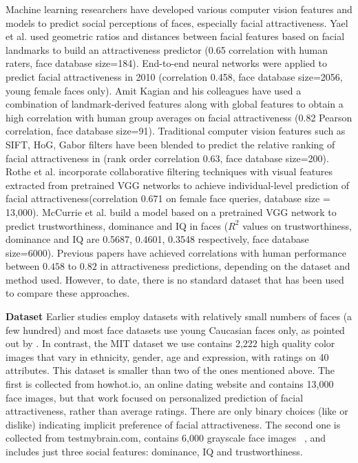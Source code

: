 \documentclass[10pt,twocolumn,letterpaper]{article}
\begin{document}
Machine learning researchers have developed various computer vision features and models to predict social perceptions of faces, especially facial attractiveness. Yael et al.\cite{eisenthal2006facial} used geometric ratios and distances between facial features based on facial landmarks to build an attractiveness predictor (0.65 correlation with human raters, face database size=184). End-to-end neural networks were applied to predict facial attractiveness in 2010\cite{gray2010predicting} (correlation 0.458, face database size=2056, young female faces only). Amit Kagian and his colleagues have used a combination of landmark-derived features along with global features to obtain a high correlation with human group averages on facial attractiveness \cite{kagian2008machine}(0.82 Pearson correlation, face database size=91). Traditional computer vision features such as SIFT, HoG, Gabor filters have been blended to predict the relative ranking of facial attractiveness in \cite{altwaijry2013relative}(rank order correlation 0.63, face database size=200). Rothe et al. incorporate collaborative filtering techniques with visual features extracted from pretrained VGG networks\cite{simonyan2014very} to achieve individual-level prediction of facial attractiveness\cite{rothe2015some}(correlation 0.671 on female face queries, database size = 13,000). McCurrie et al. \cite{mccurrie2016predicting} build a model based on a pretrained VGG network to predict trustworthiness, dominance and IQ in faces ($R^2$ values on trustworthiness, dominance and IQ are 0.5687, 0.4601, 0.3548 respectively, face database size=6000).  Previous papers have achieved correlations with human performance between $0.458$ to $0.82$ in attractiveness predictions, depending on the dataset and method used. However, to date, there is no standard dataset that has been used to compare these approaches. 

\textbf{Dataset}
Earlier studies employ datasets with relatively small numbers of faces (a few hundred) and most face datasets use young Caucasian faces only, as pointed out by \cite{laurentini2014computer}. In contrast, the MIT dataset\cite{bainbridge2013intrinsic} we use contains 2,222 high quality color images that vary in ethnicity, gender, age and expression, with ratings on 40 attributes. This dataset is smaller than two of the ones mentioned above. The first is collected from howhot.io, an online dating website\cite{rothe2015some} and contains 13,000 face images, but that work focused on personalized prediction of facial attractiveness, rather than average ratings. There are only binary choices (like or dislike) indicating implicit preference of facial attractiveness. The second one is collected from testmybrain.com, contains 6,000 grayscale face images
~\cite{mccurrie2016predicting}, and includes just three social features: dominance, IQ and trustworthiness.
\end{document}
